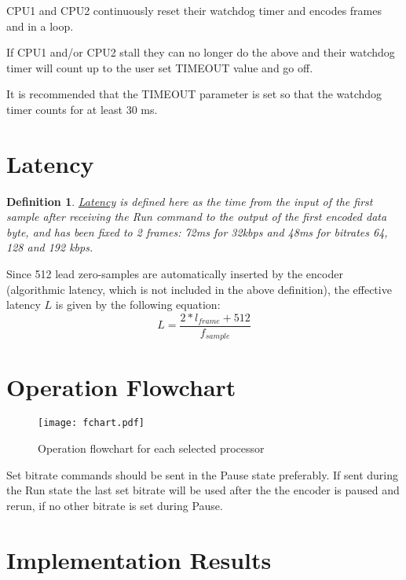 \documentclass{rep}
\theoremstyle{plain}
\newtheorem*{defn*}{Definition}
\begin{document}
CPU1 and CPU2 continuously reset their watchdog timer and encodes
frames and in a loop.

If CPU1 and/or CPU2 stall they can no longer do the above and their
watchdog timer will count up to the user set TIMEOUT value and go off.

It is recommended that the TIMEOUT parameter is set so that the
watchdog timer counts for at least 30 ms.


\section{Latency}
\label{sec:lat}

\begin{defn*}
  \underline{Latency} is defined here as the time from the input of the first sample
  after receiving the Run command to the output of the first encoded data byte,
  and has been fixed to 2 frames: 72ms for 32kbps and 48ms for bitrates 64, 128
  and 192 kbps.
\end{defn*}


Since 512 lead zero-samples are automatically inserted by the encoder
(algorithmic latency, which is not included in the above definition), the
effective latency $L$ is given by the following equation:
\begin{equation*}
  L = \frac{2*l_{frame} + 512}{f_{sample}}
\end{equation*}

\clearpage


\section{Operation Flowchart}
\label{sec:fchart}

\begin{figure}[h]
  \begin{center}
    \texttt{[image: fchart.pdf]}
    \caption{Operation flowchart for each selected processor}
    \label{fig:fchart}
  \end{center}
\end{figure}

Set bitrate commands should be sent in the Pause state preferably. If sent
during the Run state the last set bitrate will be used after the the encoder is
paused and rerun, if no other bitrate is set during Pause.



\section{Implementation Results}
\end{document}
